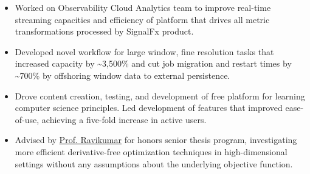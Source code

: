 \documentclass[10pt,a4paper,ragged2e,withhyper]{altacv}
\begin{document}
\begin{paracol}{2}


\begin{itemize}
\item Worked on Observability Cloud Analytics team to improve real-time streaming capacities and efficiency of platform that drives all metric transformations processed by SignalFx product.
\item Developed novel workflow for large window, fine resolution tasks that increased capacity by \textasciitilde3,500\% and cut job migration and restart times by \textasciitilde700\% by offshoring window data to external persistence.
\end{itemize}

\vspace{-5pt}
\divider
\vspace{-5pt}

\begin{itemize}
\item Drove content creation, testing, and development of free platform for learning computer science principles. Led development of features that improved ease-of-use, achieving a five-fold increase in active users.
\end{itemize}


\begin{itemize}
    \item Advised by \href{http://www.cs.cmu.edu/~pradeepr/}{\textcolor{Mahogany}{Prof. Ravikumar}} for honors senior thesis program, investigating more efficient derivative-free optimization techniques in high-dimensional settings without any assumptions about the underlying objective function.
\end{itemize}

\vspace{-5pt}
\divider
\vspace{-5pt}


\end{paracol}
\end{document}
